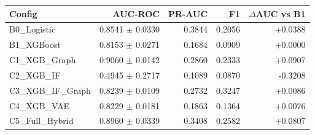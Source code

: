 \begin{tabular}{lrrrr}
\toprule
Config & AUC-ROC & PR-AUC & F1 & $\Delta$AUC vs B1 \\
\midrule
B0_Logistic & 0.8541 $\pm$ 0.0330 & 0.3844 & 0.2056 & +0.0388 \\
B1_XGBoost & 0.8153 $\pm$ 0.0271 & 0.1684 & 0.0909 & +0.0000 \\
C1_XGB_Graph & 0.9060 $\pm$ 0.0142 & 0.2860 & 0.2333 & +0.0907 \\
C2_XGB_IF & 0.4945 $\pm$ 0.2717 & 0.1089 & 0.0870 & -0.3208 \\
C3_XGB_IF_Graph & 0.8239 $\pm$ 0.0109 & 0.2732 & 0.3247 & +0.0086 \\
C4_XGB_VAE & 0.8229 $\pm$ 0.0181 & 0.1863 & 0.1364 & +0.0076 \\
C5_Full_Hybrid & 0.8960 $\pm$ 0.0339 & 0.3408 & 0.2582 & +0.0807 \\
\bottomrule
\end{tabular}
